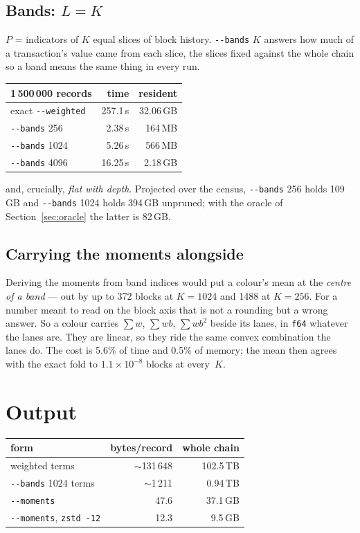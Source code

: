 \documentclass[11pt,a4paper]{article}
\newcommand{\flag}[1]{\texttt{-{}-#1}}
\begin{document}
\subsection{Bands: $L=K$}

$P$ = indicators of $K$ equal slices of block history. \flag{bands} $K$ answers
how much of a transaction's value came from each slice, the slices fixed against
the whole chain so a band means the same thing in every run.

\begin{center}
\begin{tabular}{lrr}
\toprule
1\,500\,000 records & time & resident \\
\midrule
exact \flag{weighted} & 257.1\,s & 32.06\,GB \\
\flag{bands} 256      & 2.38\,s  & 164\,MB \\
\flag{bands} 1024     & 5.26\,s  & 566\,MB \\
\flag{bands} 4096     & 16.25\,s & 2.18\,GB \\
\bottomrule
\end{tabular}
\end{center}

and, crucially, \emph{flat with depth}. Projected over the census, \flag{bands}
256 holds 109\,GB and \flag{bands} 1024 holds 394\,GB unpruned; with the oracle
of Section~\ref{sec:oracle} the latter is 82\,GB.

\subsection{Carrying the moments alongside}

Deriving the moments from band indices would put a colour's mean at the
\emph{centre of a band} --- out by up to 372 blocks at $K=1024$ and 1488 at
$K=256$. For a number meant to read on the block axis that is not a rounding but
a wrong answer. So a colour carries $\sum w$, $\sum wb$, $\sum wb^2$ beside its
lanes, in \texttt{f64} whatever the lanes are. They are linear, so they ride the
same convex combination the lanes do. The cost is 5.6\% of time and 0.5\% of
memory; the mean then agrees with the exact fold to $1.1\times10^{-8}$ blocks at
every~$K$.

\section{Output}

\begin{center}
\begin{tabular}{lrr}
\toprule
form & bytes/record & whole chain \\
\midrule
weighted terms                & $\sim$131\,648 & 102.5\,TB \\
\flag{bands} 1024 terms       & $\sim$1\,211   & 0.94\,TB \\
\flag{moments}                & 47.6           & 37.1\,GB \\
\flag{moments}, \texttt{zstd -12} & 12.3       & 9.5\,GB \\
\bottomrule
\end{tabular}
\end{center}
\end{document}
